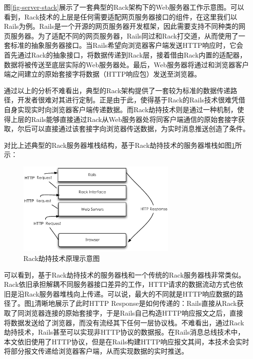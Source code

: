 图\ref{fig-server-stack}展示了一套典型的Rack架构下的Web服务器工作示意图。可以看到，Rack技术的上层是任何需要适配网页服务器接口的组件，在这里我们以Rails为例。Rails是一个开源的网页服务器开发框架，因此需要支持不同种类的网页服务器。为了适配不同的网页服务器，Rails同过和Rack打交道，从而使用了一套标准的抽象服务器接口。当Rails希望向浏览器客户端发送HTTP响应时，它会首先通过Rack的抽象接口，将数据传递到Rack层，接着借由Rack内置的适配器，数据将被传送至底层实际的Web服务器处。最后，Web服务器将通过和浏览器客户端之间建立的原始套接字将数据（HTTP响应包）发送至浏览器。

通过以上的分析不难看出，典型的Rack架构提供了一套较为标准的数据传递路径，开发者很难对其进行定制。正是由于此，使得基于Rack的Rails技术很难凭借自身实现实时向浏览器客户端传递数据。而Rack劫持技术则是通过一种机制，使得上层的Rails能够直接通过Rack从Web服务器处将同客户端通信的原始套接字获取，尔后可以直接通过该套接字向浏览器传送数据，为实时消息推送创造了条件。

对比上述典型的Rack服务器堆栈结构，基于Rack劫持技术的服务器堆栈如图\ref{fig-rack-hijack}所示：

\begin{figure}[h]
\centering
\includegraphics[width=0.7\textwidth]{images/overview/rack_hijack.eps}
\caption{Rack劫持技术原理示意图}
\label{fig-rack-hijack}
\end{figure}

可以看到，基于Rack劫持技术的服务器栈和一个传统的Rack服务器栈非常类似。Rack依旧承担解耦不同服务器接口差异的工作，HTTP请求的数据流动方式也依旧是沿Rack服务器堆栈向上传递。可以说，最大的不同就是HTTP响应数据的路径了。图\ref{fig-rack-hijack}清晰地展示了此时HTTP Response是如何传递的：Rails直接从Rack获取了同浏览器连接的原始套接字，于是Rails自己构造HTTP响应报文之后，直接将数据发送给了浏览器，而没有流经其下任何一层协议栈。不难看出，通过Rack劫持技术，Rails甚至可以实现非HTTP协议的数据报。在Rails消息总线技术中，本文依旧使用了HTTP协议，但是在Rails构建HTTP响应报文其间，本技术会实时将部分报文传递给浏览器客户端，从而实现数据的实时推送。

